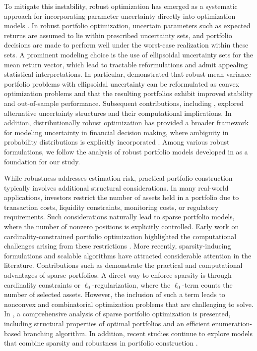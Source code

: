 \documentclass[11pt]{article}
\theoremstyle{plain}
\theoremstyle{definition}
\theoremstyle{plain}
\begin{document}
To mitigate this instability, robust optimization has emerged as a systematic approach for incorporating parameter uncertainty directly into optimization models \cite{BenTalNemirovski1998,BenTalNemirovski2009,ElGhaouiOustryLebret1998}. In robust portfolio optimization, uncertain parameters such as expected returns are assumed to lie within prescribed uncertainty sets, and portfolio decisions are made to perform well under the worst-case realization within these sets. A prominent modeling choice is the use of ellipsoidal uncertainty sets for the mean return vector, which lead to tractable reformulations and admit appealing statistical interpretations. In particular, \cite{GoldfarbIyengar2003} demonstrated that robust mean-variance portfolio problems with ellipsoidal uncertainty can be reformulated as convex optimization problems and that the resulting portfolios exhibit improved stability and out-of-sample performance. Subsequent contributions, including \cite{BertsimasSim2004}, explored alternative uncertainty structures and their computational implications. In addition, distributionally robust optimization has provided a broader framework for modeling uncertainty in financial decision making, where ambiguity in probability distributions is explicitly incorporated \cite{DelageYe2010,GohSim2010,WiesemannKuhnSim2014}. Among various robust formulations, we follow the analysis of robust portfolio models developed in \cite{Pinar2016} as a foundation for our study.

While robustness addresses estimation risk, practical portfolio construction typically involves additional structural considerations. In many real-world applications, investors restrict the number of assets held in a portfolio due to transaction costs, liquidity constraints, monitoring costs, or regulatory requirements. Such considerations naturally lead to sparse portfolio models, where the number of nonzero positions is explicitly controlled. Early work on cardinality-constrained portfolio optimization highlighted the computational challenges arising from these restrictions \cite{ChangMeadeBeasleySharaiha2000,LoboFazelBoyd2007,BonamiLejeune2009}. More recently, sparsity-inducing formulations and scalable algorithms have attracted considerable attention in the literature. Contributions such as \cite{Brodie2009,BertsimasCoryWright2022,WuSunGeZhaoZeng2024,KobayashiTakanoNakata2023} demonstrate the practical and computational advantages of sparse portfolios. A direct way to enforce sparsity is through cardinality constraints or $\ell_0$-regularization, where the $\ell_0$-term counts the number of selected assets. However, the inclusion of such a term leads to nonconvex and combinatorial optimization problems that are challenging to solve. In \cite{SenAkkayaPinar2025}, a comprehensive analysis of sparse portfolio optimization is presented, including structural properties of optimal portfolios and an efficient enumeration-based branching algorithm. In addition, recent studies continue to explore models that combine sparsity and robustness in portfolio construction \cite{ZhaoJiangYang2023,AnnunziataEtAl2025}.
\end{document}
